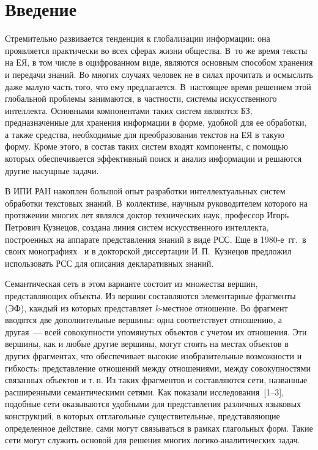 \begin{multicols}{2}

\label{st\stat}


\section{Введение} %

 Стремительно развивается тенденция к глобализации информации: она
проявляется практически во всех сферах жизни общества. В~то же время
тексты на ЕЯ, в том числе в оцифрованном виде, являются
основным способом хранения и передачи знаний. Во многих случаях человек
не в силах прочитать и осмыслить даже малую часть того, что ему
предлагается. В~настоящее время решением этой глобальной проблемы
занимаются, в частности, системы искусственного интеллекта. Основными
компонентами таких систем являются БЗ, предназначенные для
хранения информации в форме, удобной для ее обработки, а также средства,
необходимые для преобразования текстов на ЕЯ в такую
форму. Кроме этого, в состав таких систем входят компоненты, с помощью
которых обеспечивается эффективный поиск и анализ информации и решаются
другие насущные задачи.

 В ИПИ РАН накоплен большой опыт разработки интеллектуальных
систем обработки текстовых знаний. В~коллективе, научным руководителем
которого на протяжении многих лет являлся доктор технических наук,
профессор Игорь Петрович Кузнецов, создана линия систем искусственного
интеллекта, построенных на аппарате представления знаний в виде
РСС. Еще в 1980-е~гг.\ в своих
монографиях~\cite{ma-l1, ma-l2} и в докторской диссертации И.\,П.~Кузнецов
предложил использовать РСС для описания декларативных знаний.

 Семантическая сеть в этом варианте состоит из множества вершин,
представляющих объекты. Из вершин составляются элементарные фрагменты (ЭФ),
каждый из которых представляет $k$-мест\-ное отношение. Во фрагмент
вводятся две дополнительные вершины: одна соответствует отношению, а
другая~--- всей совокупности упомянутых объектов с учетом их отношения.
Эти вершины, как и любые другие вершины, могут стоять на местах объектов в
других фрагментах, что обеспечивает высокие изоб\-ра\-зи\-тель\-ные возможности и
гибкость: представление отношений между отношениями, между
совокупностями связанных объектов и т.\,п. Из таких фрагментов и
составляются сети, названные расширенными семантическими сетями.
Как показали исследования~[1--3], подобные сети оказываются удобными для
представления различных языковых конструкций, в которых отглагольные
существительные, представляющие определенное действие, сами могут
связываться в рамках глагольных форм. Такие сети могут служить основой для
решения многих ло\-ги\-ко-ана\-ли\-ти\-че\-ских задач.


\end{multicols}
